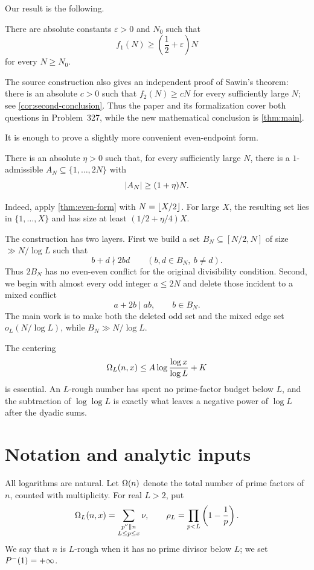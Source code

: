 \documentclass[11pt]{article}
\begin{document}
Our result is the following.

\begin{theorem}\label{thm:main}
There are absolute constants \(\varepsilon>0\) and \(N_0\) such that
\[
 f_1(N)\geq\left(\frac12+\varepsilon\right)N
\]
for every \(N\geq N_0\).
\end{theorem}

The source construction also gives an independent proof of Sawin's theorem:
there is an absolute \(c>0\) such that \(f_2(N)\geq cN\) for every
sufficiently large \(N\); see \cref{cor:second-conclusion}. Thus the paper and
its formalization cover both questions in Problem~327, while the new
mathematical conclusion is \cref{thm:main}.

It is enough to prove a slightly more convenient even-endpoint form.

\begin{theorem}\label{thm:even-form}
There is an absolute \(\eta>0\) such that, for every sufficiently large
\(N\), there is a \(1\)-admissible
\(A_N\subseteq\{1,\ldots,2N\}\) with
\[
 \left|A_N\right|\geq (1+\eta)N.
\]
\end{theorem}

Indeed, apply \cref{thm:even-form} with
\(N=\left\lfloor X/2\right\rfloor\). For large \(X\), the resulting set lies in
\(\{1,\ldots,X\}\) and has size at least
\((1/2+\eta/4)X\).

The construction has two layers. First we build a set
\(B_N\subseteq[N/2,N]\) of size \(\gg N/\log L\) such that
\[
 b+d\nmid2bd\qquad(b,d\in B_N,\ b\ne d).
\]
Thus \(2B_N\) has no even-even conflict for the original divisibility
condition. Second, we begin with almost every odd integer \(a\leq2N\) and
delete those incident to a mixed conflict
\[
 a+2b\mid ab,\qquad b\in B_N.
\]
The main work is to make both the deleted odd set and the mixed edge set
\(o_L(N/\log L)\), while \(B_N\gg N/\log L\).

The centering
\[
 \Omega_L(n,x)\leq
 A\log\frac{\log x}{\log L}+K
\]
is essential. An \(L\)-rough number has spent no prime-factor budget below
\(L\), and the subtraction of \(\log\log L\) is exactly what leaves a
negative power of \(\log L\) after the dyadic sums.

\section{Notation and analytic inputs}\label{sec:inputs}

All logarithms are natural. Let \(\Omega(n)\) denote the total number of prime
factors of \(n\), counted with multiplicity. For real \(L>2\), put
\[
 \Omega_L(n,x)=
 \sum_{\substack{p^\nu\parallel n\\L\leq p\leq x}}\nu,
\qquad
 \rho_L=\prod_{p<L}\left(1-\frac1p\right).
\]
We say that \(n\) is \(L\)-rough when it has no prime divisor below \(L\);
we set \(P^-(1)=+\infty\).
\end{document}
